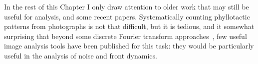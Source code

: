 %  
  In the rest of this Chapter I only draw attention to older work that may still be useful for analysis, and some recent papers. 
  Systematically counting phyllotactic patterns from photographs is not that difficult, but it is tedious, and it somewhat surprising that beyond some  discrete Fourier transform approaches~\cite{negishiDeterminingParastichyPairs2022},  few useful image analysis tools  have been published for this task: they would be particularly useful in the analysis of noise and front dynamics. 
  
   
